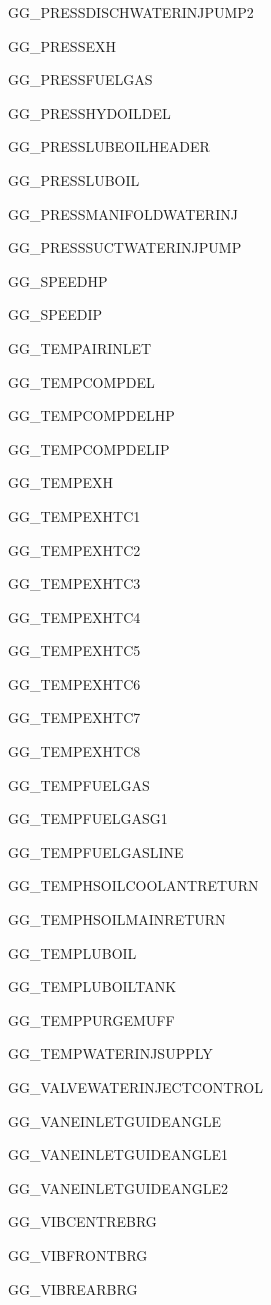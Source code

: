 \documentclass[runningheads]{llncs}
\begin{document}
\begin{multicols}{3}
\begin{enumerate}
{			\item GG\_PRESSDISCHWATERINJPUMP2
			\item GG\_PRESSEXH
			\item GG\_PRESSFUELGAS
			\item GG\_PRESSHYDOILDEL
			\item GG\_PRESSLUBEOILHEADER
			\item GG\_PRESSLUBOIL
			\item GG\_PRESSMANIFOLDWATERINJ
			\item GG\_PRESSSUCTWATERINJPUMP
			\item GG\_SPEEDHP
			\item GG\_SPEEDIP
			\item GG\_TEMPAIRINLET
			\item GG\_TEMPCOMPDEL
			\item GG\_TEMPCOMPDELHP
			\item GG\_TEMPCOMPDELIP
			\item GG\_TEMPEXH
			\item GG\_TEMPEXHTC1
			\item GG\_TEMPEXHTC2
			\item GG\_TEMPEXHTC3
			\item GG\_TEMPEXHTC4
			\item GG\_TEMPEXHTC5
			\item GG\_TEMPEXHTC6
			\item GG\_TEMPEXHTC7
			\item GG\_TEMPEXHTC8
			\item GG\_TEMPFUELGAS
			\item GG\_TEMPFUELGASG1
			\item GG\_TEMPFUELGASLINE
			\item GG\_TEMPHSOILCOOLANTRETURN
			\item GG\_TEMPHSOILMAINRETURN
			\item GG\_TEMPLUBOIL
			\item GG\_TEMPLUBOILTANK
			\item GG\_TEMPPURGEMUFF
			\item GG\_TEMPWATERINJSUPPLY
			\item GG\_VALVEWATERINJECTCONTROL
			\item GG\_VANEINLETGUIDEANGLE
			\item GG\_VANEINLETGUIDEANGLE1
			\item GG\_VANEINLETGUIDEANGLE2
			\item GG\_VIBCENTREBRG
			\item GG\_VIBFRONTBRG
			\item GG\_VIBREARBRG
}
\end{enumerate}
\end{multicols}
\end{document}
